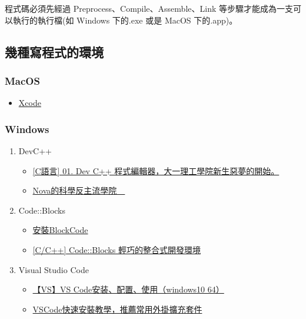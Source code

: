 \documentclass[12pt,a4paper]{article}
\begin{document}
程式碼必須先經過 Preprocess、Compile、Assemble、Link 等步驟才能成為一支可以執行的執行檔(如 Windows 下的.exe 或是 MacOS 下的.app)。

\subsection{幾種寫程式的環境}
\label{sec:org690b25e}
\subsubsection{MacOS}
\label{sec:org29383e6}
\begin{itemize}
\item \href{https://developer.apple.com/xcode/}{Xcode}
\end{itemize}
\subsubsection{Windows}
\label{sec:orgc97e2e6}
\begin{enumerate}
\item DevC++
\label{sec:org38b5eb9}
\begin{itemize}
\item \href{https://progressbar.tw/posts/7}{[C語言] 01. Dev C++ 程式編輯器，大一理工學院新生惡夢的開始。}
\item \href{http://selfinquiring.hatenablog.com/entry/2016/03/18/204352}{Nova的科學反主流學院　}
\end{itemize}
\item Code::Blocks
\label{sec:org59458ba}
\begin{itemize}
\item \href{https://blog.csdn.net/DongChengRong/article/details/78624068}{安裝BlockCode}
\item \href{https://mks.tw/1053/cc-codeblocks-\%E8\%BC\%95\%E5\%B7\%A7\%E7\%9A\%84\%E6\%95\%B4\%E5\%90\%88\%E5\%BC\%8F\%E9\%96\%8B\%E7\%99\%BC\%E7\%92\%B0\%E5\%A2\%83}{[C/C++] Code::Blocks 輕巧的整合式開發環境}
\end{itemize}
\item Visual Studio Code
\label{sec:orgcc2d69a}
\begin{itemize}
\item \href{https://blog.csdn.net/HelloZEX/article/details/84029810}{【VS】VS Code安装、配置、使用（windows10 64）}
\item \href{https://tw.alphacamp.co/blog/visual-studio-code-editor-tutorial-and-extensions}{VSCode快速安裝教學，推薦常用外掛擴充套件}
\end{itemize}
\end{enumerate}
\end{document}
